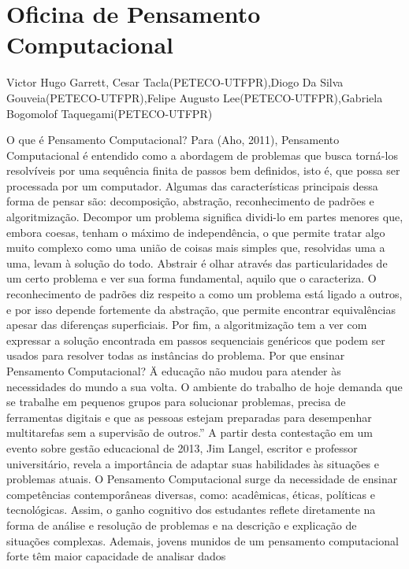 

\section{Oficina de Pensamento Computacional}

Victor Hugo Garrett, Cesar Tacla(PETECO-UTFPR),Diogo Da Silva Gouveia(PETECO-UTFPR),Felipe Augusto Lee(PETECO-UTFPR),Gabriela Bogomolof Taquegami(PETECO-UTFPR)

O que é Pensamento Computacional?
Para (Aho, 2011), Pensamento Computacional é entendido como a abordagem de
problemas que busca torná-los resolvíveis por uma sequência finita de passos bem definidos, isto
é, que possa ser processada por um computador. Algumas das características principais dessa
forma de pensar são: decomposição, abstração, reconhecimento de padrões e algoritmização.
Decompor um problema significa dividi-lo em partes menores que, embora coesas, tenham o
máximo de independência, o que permite tratar algo muito complexo como uma união de coisas
mais simples que, resolvidas uma a uma, levam à solução do todo. Abstrair é olhar através das
particularidades de um certo problema e ver sua forma fundamental, aquilo que o caracteriza. O
reconhecimento de padrões diz respeito a como um problema está ligado a outros, e por isso
depende fortemente da abstração, que permite encontrar equivalências apesar das diferenças
superficiais. Por fim, a algoritmização tem a ver com expressar a solução encontrada em passos
sequenciais genéricos que podem ser usados para resolver todas as instâncias do problema.
Por que ensinar Pensamento Computacional?
\"A educação não mudou para atender às necessidades do mundo a sua volta. O ambiente
do trabalho de hoje demanda que se trabalhe em pequenos grupos para solucionar problemas,
precisa de ferramentas digitais e que as pessoas estejam preparadas para desempenhar
multitarefas sem a supervisão de outros.” A partir desta contestação em um evento sobre gestão
educacional de 2013, Jim Langel, escritor e professor universitário, revela a importância de
adaptar suas habilidades às situações e problemas atuais. O Pensamento Computacional surge da
necessidade de ensinar competências contemporâneas diversas, como: acadêmicas, éticas,
políticas e tecnológicas. Assim, o ganho cognitivo dos estudantes reflete diretamente na forma de
análise e resolução de problemas e na descrição e explicação de situações complexas. Ademais,
jovens munidos de um pensamento computacional forte têm maior capacidade de analisar dados
